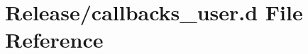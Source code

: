 \hypertarget{callbacks__user_8d}{}\section{Release/callbacks\+\_\+user.d File Reference}
\label{callbacks__user_8d}
